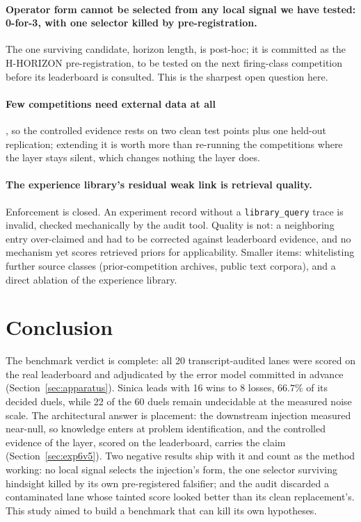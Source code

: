\documentclass[11pt,a4paper]{article}
\begin{document}
\paragraph{Operator form cannot be selected from any local signal we have tested: 0-for-3, with
one selector killed by pre-registration.} The one surviving candidate, horizon length, is post-hoc;
it is committed as the H-HORIZON pre-registration, to be tested on the next firing-class
competition before its leaderboard is consulted. This is the sharpest open question here.

\paragraph{Few competitions need external data at all}, so the controlled evidence rests on two clean test points
plus one held-out replication; extending it is worth more than re-running the competitions where
the layer stays silent, which changes nothing the layer does.

\paragraph{The experience library's residual weak link is retrieval quality.} Enforcement is
closed. An experiment record without a \texttt{library\_query} trace is invalid, checked
mechanically by the audit tool. Quality is not: a neighboring entry over-claimed and had to be
corrected against leaderboard evidence, and no mechanism yet scores retrieved priors for
applicability. Smaller items: whitelisting further source classes (prior-competition archives,
public text corpora), and a direct ablation of the experience library.

\section{Conclusion}

The benchmark verdict is complete: all 20 transcript-audited lanes were scored on the real leaderboard and adjudicated by the error model committed in advance (Section~\ref{sec:apparatus}). Sinica leads with 16 wins to 8 losses, $66.7\%$ of its decided duels, while 22 of the 60 duels remain undecidable at the measured noise scale. The architectural answer is placement: the downstream injection measured near-null, so knowledge enters at problem identification, and the controlled evidence of the layer, scored on the leaderboard, carries the claim (Section~\ref{sec:exp6v5}). Two negative results ship with it and count as the method working: no local signal selects the injection's form, the one selector surviving hindsight killed by its own pre-registered falsifier; and the audit discarded a contaminated lane whose tainted score looked better than its clean replacement's. This study aimed to build a benchmark that can kill its own hypotheses.
\end{document}
